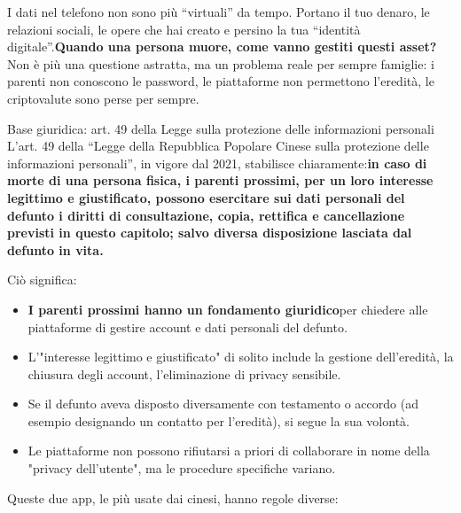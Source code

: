 
I dati nel telefono non sono più “virtuali” da tempo. Portano il tuo denaro, le relazioni sociali, le opere che hai creato e persino la tua “identità digitale”.\textbf{Quando una persona muore, come vanno gestiti questi asset?}Non è più una questione astratta, ma un problema reale per sempre famiglie: i parenti non conoscono le password, le piattaforme non permettono l'eredità, le criptovalute sono perse per sempre.

\begin{tcbinfo}{Base giuridica: art. 49 della Legge sulla protezione delle informazioni personali}
L'art. 49 della “Legge della Repubblica Popolare Cinese sulla protezione delle informazioni personali”, in vigore dal 2021, stabilisce chiaramente:\textbf{in caso di morte di una persona fisica, i parenti prossimi, per un loro interesse legittimo e giustificato, possono esercitare sui dati personali del defunto i diritti di consultazione, copia, rettifica e cancellazione previsti in questo capitolo; salvo diversa disposizione lasciata dal defunto in vita.}

Ciò significa:

\begin{itemize}
  \item \textbf{I parenti prossimi hanno un fondamento giuridico}per chiedere alle piattaforme di gestire account e dati personali del defunto.
  \item L'"interesse legittimo e giustificato" di solito include la gestione dell'eredità, la chiusura degli account, l'eliminazione di privacy sensibile.
  \item Se il defunto aveva disposto diversamente con testamento o accordo (ad esempio designando un contatto per l'eredità), si segue la sua volontà.
  \item Le piattaforme non possono rifiutarsi a priori di collaborare in nome della "privacy dell'utente", ma le procedure specifiche variano.
\end{itemize}

\end{tcbinfo}


Queste due app, le più usate dai cinesi, hanno regole diverse:

